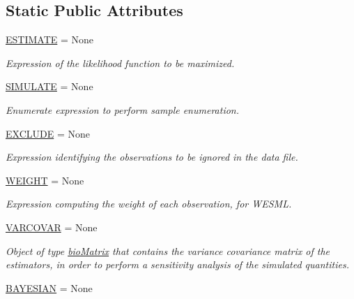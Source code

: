 \subsection*{Static Public Attributes}
\begin{DoxyCompactItemize}
\item 
\hyperlink{classbiogeme_1_1_b_i_o_g_e_m_e___o_b_j_e_c_t_a3e2437d2271f3f9fe27913e1e1312c47}{E\+S\+T\+I\+M\+A\+T\+E} = None
\begin{DoxyCompactList}\small\item\em Expression of the likelihood function to be maximized. \end{DoxyCompactList}\item 
\hyperlink{classbiogeme_1_1_b_i_o_g_e_m_e___o_b_j_e_c_t_ab1eb6d8235bf68d484b0a81eb7d41003}{S\+I\+M\+U\+L\+A\+T\+E} = None
\begin{DoxyCompactList}\small\item\em Enumerate expression to perform sample enumeration. \end{DoxyCompactList}\item 
\hyperlink{classbiogeme_1_1_b_i_o_g_e_m_e___o_b_j_e_c_t_a599c398c094f98e58d93b96c2dc81b97}{E\+X\+C\+L\+U\+D\+E} = None
\begin{DoxyCompactList}\small\item\em Expression identifying the observations to be ignored in the data file. \end{DoxyCompactList}\item 
\hyperlink{classbiogeme_1_1_b_i_o_g_e_m_e___o_b_j_e_c_t_a2a9babe593d7115e3bfd57057ab9c97e}{W\+E\+I\+G\+H\+T} = None
\begin{DoxyCompactList}\small\item\em Expression computing the weight of each observation, for W\+E\+S\+M\+L. \end{DoxyCompactList}\item 
\hyperlink{classbiogeme_1_1_b_i_o_g_e_m_e___o_b_j_e_c_t_ad9fc8223d62db27a51cd10f55b796ea0}{V\+A\+R\+C\+O\+V\+A\+R} = None
\begin{DoxyCompactList}\small\item\em Object of type \hyperlink{namespacebio_matrix}{bio\+Matrix} that contains the variance covariance matrix of the estimators, in order to perform a sensitivity analysis of the simulated quantities. \end{DoxyCompactList}\item 
\hyperlink{classbiogeme_1_1_b_i_o_g_e_m_e___o_b_j_e_c_t_accb5e1ba6dbea4d40a8eef3f33ac2c8e}{B\+A\+Y\+E\+S\+I\+A\+N} = None

\end{DoxyCompactItemize}
